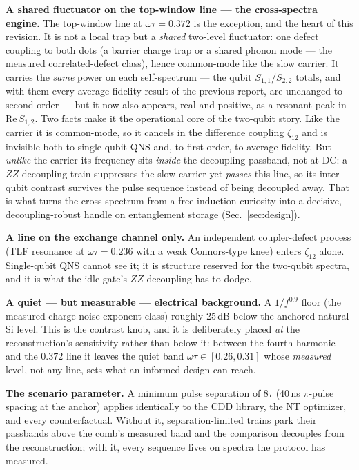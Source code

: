 \documentclass[10pt]{article}
\begin{document}
\textbf{A shared fluctuator on the top-window line --- the cross-spectra
engine.} The top-window line at $\omega\tau = 0.372$ is the exception, and the
heart of this revision. It is not a local trap but a \emph{shared} two-level
fluctuator: one defect coupling to both dots (a barrier charge trap or a
shared phonon mode --- the measured correlated-defect class), hence
common-mode like the slow carrier. It carries the \emph{same} power on each
self-spectrum --- the qubit $S_{1,1}/S_{2,2}$ totals, and with them every
average-fidelity result of the previous report, are unchanged to second order
--- but it now also appears, real and positive, as a resonant peak in
$\mathrm{Re}\,S_{1,2}$. Two facts make it the operational core of the
two-qubit story. Like the carrier it is common-mode, so it cancels in the
difference coupling $\zeta_{12}$ and is invisible both to single-qubit QNS
and, to first order, to average fidelity. But \emph{unlike} the carrier its
frequency sits \emph{inside} the decoupling passband, not at DC: a
$ZZ$-decoupling train suppresses the slow carrier yet \emph{passes} this line,
so its inter-qubit contrast survives the pulse sequence instead of being
decoupled away. That is what turns the cross-spectrum from a free-induction
curiosity into a decisive, decoupling-robust handle on entanglement storage
(Sec.~\ref{sec:design}).

\textbf{A line on the exchange channel only.} An independent coupler-defect
process (TLF resonance at $\omega\tau = 0.236$ with a weak Connors-type knee)
enters $\zeta_{12}$ alone. Single-qubit QNS cannot see it; it is structure
reserved for the two-qubit spectra, and it is what the idle gate's
$ZZ$-decoupling has to dodge.

\textbf{A quiet --- but measurable --- electrical background.}
A $1/f^{0.9}$ floor (the measured charge-noise exponent class) roughly
25\,dB below the anchored natural-Si level. This is the contrast knob, and
it is deliberately placed \emph{at} the reconstruction's sensitivity rather
than below it: between the fourth harmonic and the $0.372$ line it leaves
the quiet band $\omega\tau \in [0.26, 0.31]$ whose \emph{measured} level,
not any line, sets what an informed design can reach.

\textbf{The scenario parameter.} A minimum pulse separation of $8\tau$
(40\,ns $\pi$-pulse spacing at the anchor) applies identically to the CDD
library, the NT optimizer, and every counterfactual. Without it,
separation-limited trains park their passbands above the comb's measured
band and the comparison decouples from the reconstruction; with it, every
sequence lives on spectra the protocol has measured.
\end{document}
